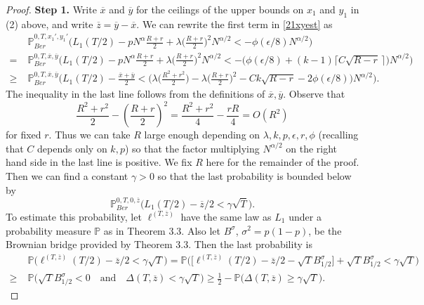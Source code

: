 \begin{proof}
		\noindent\textbf{Step 1.} Write $\overline{x}$ and $\overline{y}$ for the ceilings of the upper bounds on $x_1$ and $y_1$ in (2) above, and write $\overline{z} = \overline{y}-\overline{x}$. We can rewrite the first term in \eqref{21xyest} as
		\begin{align*}
		&\mathbb{P}^{0,T,x_1',y_1'}_{Ber} \Big(L_1(T/2) - pN^\alpha \frac{R+r}{2} + \lambda\Big(\frac{R+r}{2}\Big)^2 N^{\alpha/2} < -\phi(\epsilon/8)N^{\alpha/2}\Big)\\
		= \; & \mathbb{P}^{0,T,\overline{x},\overline{y}}_{Ber}\Big(L_1(T/2) - pN^\alpha\frac{R+r}{2} + \lambda\Big(\frac{R+r}{2}\Big)^2 N^{\alpha/2} < -\big(\phi(\epsilon/8) + (k-1)\lceil C\sqrt{R-r}\,\rceil\big)N^{\alpha/2}\Big)\\
		\geq \; & \mathbb{P}^{0,T,\overline{x},\overline{y}}_{Ber}\Big(L_1(T/2) - \frac{\overline{x} + \overline{y}}{2} < \Big( \lambda\Big(\frac{R^2+r^2}{2}\Big) - \lambda\Big(\frac{R+r}{2}\Big)^2 - Ck\sqrt{R-r} - 2\phi(\epsilon/8)\Big)N^{\alpha/2}\Big).
		\end{align*}
		The inequality in the last line follows from the definitions of $\overline{x},\overline{y}$. Observe that
		\[
		\frac{R^2+r^2}{2} - \left(\frac{R+r}{2}\right)^2 = \frac{R^2 + r^2}{4} - \frac{rR}{4} = O(R^2)
		\]
		for fixed $r$. Thus we can take $R$ large enough depending on $\lambda,k,p,\epsilon,r,\phi$ (recalling that $C$ depends only on $k,p$) so that the factor multiplying $N^{\alpha/2}$ on the right hand side in the last line is positive. We fix $R$ here for the remainder of the proof. Then we can find a constant $\gamma>0$ so that the last probability is bounded below by
		\[
		\mathbb{P}^{0,T,0,\overline{z}}_{Ber}\Big(L_1(T/2) - \overline{z}/2 < \gamma\sqrt{T}\Big).
		\]
		To estimate this probability, let $\ell^{(T,\overline{z})}$ have the same law as $L_1$ under a probability measure $\mathbb{P}$ as in Theorem 3.3. Also let $B^\sigma$, $\sigma^2 = p(1-p)$, be the Brownian bridge provided by Theorem 3.3. Then the last probability is
		\begin{align*}
		& \mathbb{P}\Big( \ell^{(T,\overline{z})}(T/2) - \overline{z}/2 < \gamma\sqrt{T}\Big) = \mathbb{P}\Big(\Big[\ell^{(T,\overline{z})}(T/2) - \overline{z}/2 - \sqrt{T}B^\sigma_{1/2}\Big] + \sqrt{T}B^\sigma_{1/2} < \gamma\sqrt{T}\Big)\\
		\geq \; & \mathbb{P}\Big(\sqrt{T}B^\sigma_{1/2} < 0\quad\mathrm{and}\quad \Delta(T,\overline{z}) < \gamma\sqrt{T}\Big) \geq \frac{1}{2} - \mathbb{P}\Big(\Delta(T,\overline{z}) \geq \gamma\sqrt{T}\Big).
		\end{align*}

\end{proof}
